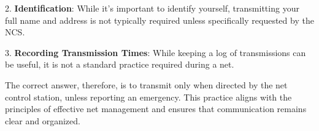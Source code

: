 2. \textbf{Identification}: While it's important to identify yourself, transmitting your full name and address is not typically required unless specifically requested by the NCS.

3. \textbf{Recording Transmission Times}: While keeping a log of transmissions can be useful, it is not a standard practice required during a net.

The correct answer, therefore, is to transmit only when directed by the net control station, unless reporting an emergency. This practice aligns with the principles of effective net management and ensures that communication remains clear and organized.

